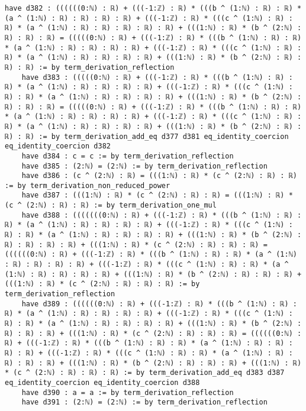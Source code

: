 \documentclass{article}
\begin{document}
\begin{tcolorbox}[colback=white!10, width=\linewidth]
\begin{lstlisting}[language=Lean4]
    have d382 : ((((((0:ℕ) : ℝ) + (((-1:ℤ) : ℝ) * (((b ^ (1:ℕ) : ℝ) : ℝ) * (a ^ (1:ℕ) : ℝ) : ℝ) : ℝ) : ℝ) + (((-1:ℤ) : ℝ) * (((c ^ (1:ℕ) : ℝ) : ℝ) * (a ^ (1:ℕ) : ℝ) : ℝ) : ℝ) : ℝ) : ℝ) + (((1:ℕ) : ℝ) * (b ^ (2:ℕ) : ℝ) : ℝ) : ℝ) = (((((0:ℕ) : ℝ) + (((-1:ℤ) : ℝ) * (((b ^ (1:ℕ) : ℝ) : ℝ) * (a ^ (1:ℕ) : ℝ) : ℝ) : ℝ) : ℝ) + (((-1:ℤ) : ℝ) * (((c ^ (1:ℕ) : ℝ) : ℝ) * (a ^ (1:ℕ) : ℝ) : ℝ) : ℝ) : ℝ) + (((1:ℕ) : ℝ) * (b ^ (2:ℕ) : ℝ) : ℝ) : ℝ) := by term_derivation_reflection
    have d383 : (((((0:ℕ) : ℝ) + (((-1:ℤ) : ℝ) * (((b ^ (1:ℕ) : ℝ) : ℝ) * (a ^ (1:ℕ) : ℝ) : ℝ) : ℝ) : ℝ) + (((-1:ℤ) : ℝ) * (((c ^ (1:ℕ) : ℝ) : ℝ) * (a ^ (1:ℕ) : ℝ) : ℝ) : ℝ) : ℝ) + (((1:ℕ) : ℝ) * (b ^ (2:ℕ) : ℝ) : ℝ) : ℝ) = (((((0:ℕ) : ℝ) + (((-1:ℤ) : ℝ) * (((b ^ (1:ℕ) : ℝ) : ℝ) * (a ^ (1:ℕ) : ℝ) : ℝ) : ℝ) : ℝ) + (((-1:ℤ) : ℝ) * (((c ^ (1:ℕ) : ℝ) : ℝ) * (a ^ (1:ℕ) : ℝ) : ℝ) : ℝ) : ℝ) + (((1:ℕ) : ℝ) * (b ^ (2:ℕ) : ℝ) : ℝ) : ℝ) := by term_derivation_add_eq d377 d381 eq_identity_coercion eq_identity_coercion d382
    have d384 : c = c := by term_derivation_reflection
    have d385 : (2:ℕ) = (2:ℕ) := by term_derivation_reflection
    have d386 : (c ^ (2:ℕ) : ℝ) = (((1:ℕ) : ℝ) * (c ^ (2:ℕ) : ℝ) : ℝ) := by term_derivation_non_reduced_power
    have d387 : (((1:ℕ) : ℝ) * (c ^ (2:ℕ) : ℝ) : ℝ) = (((1:ℕ) : ℝ) * (c ^ (2:ℕ) : ℝ) : ℝ) := by term_derivation_one_mul
    have d388 : (((((((0:ℕ) : ℝ) + (((-1:ℤ) : ℝ) * (((b ^ (1:ℕ) : ℝ) : ℝ) * (a ^ (1:ℕ) : ℝ) : ℝ) : ℝ) : ℝ) + (((-1:ℤ) : ℝ) * (((c ^ (1:ℕ) : ℝ) : ℝ) * (a ^ (1:ℕ) : ℝ) : ℝ) : ℝ) : ℝ) + (((1:ℕ) : ℝ) * (b ^ (2:ℕ) : ℝ) : ℝ) : ℝ) : ℝ) + (((1:ℕ) : ℝ) * (c ^ (2:ℕ) : ℝ) : ℝ) : ℝ) = ((((((0:ℕ) : ℝ) + (((-1:ℤ) : ℝ) * (((b ^ (1:ℕ) : ℝ) : ℝ) * (a ^ (1:ℕ) : ℝ) : ℝ) : ℝ) : ℝ) + (((-1:ℤ) : ℝ) * (((c ^ (1:ℕ) : ℝ) : ℝ) * (a ^ (1:ℕ) : ℝ) : ℝ) : ℝ) : ℝ) + (((1:ℕ) : ℝ) * (b ^ (2:ℕ) : ℝ) : ℝ) : ℝ) + (((1:ℕ) : ℝ) * (c ^ (2:ℕ) : ℝ) : ℝ) : ℝ) := by term_derivation_reflection
    have d389 : ((((((0:ℕ) : ℝ) + (((-1:ℤ) : ℝ) * (((b ^ (1:ℕ) : ℝ) : ℝ) * (a ^ (1:ℕ) : ℝ) : ℝ) : ℝ) : ℝ) + (((-1:ℤ) : ℝ) * (((c ^ (1:ℕ) : ℝ) : ℝ) * (a ^ (1:ℕ) : ℝ) : ℝ) : ℝ) : ℝ) + (((1:ℕ) : ℝ) * (b ^ (2:ℕ) : ℝ) : ℝ) : ℝ) + (((1:ℕ) : ℝ) * (c ^ (2:ℕ) : ℝ) : ℝ) : ℝ) = ((((((0:ℕ) : ℝ) + (((-1:ℤ) : ℝ) * (((b ^ (1:ℕ) : ℝ) : ℝ) * (a ^ (1:ℕ) : ℝ) : ℝ) : ℝ) : ℝ) + (((-1:ℤ) : ℝ) * (((c ^ (1:ℕ) : ℝ) : ℝ) * (a ^ (1:ℕ) : ℝ) : ℝ) : ℝ) : ℝ) + (((1:ℕ) : ℝ) * (b ^ (2:ℕ) : ℝ) : ℝ) : ℝ) + (((1:ℕ) : ℝ) * (c ^ (2:ℕ) : ℝ) : ℝ) : ℝ) := by term_derivation_add_eq d383 d387 eq_identity_coercion eq_identity_coercion d388
    have d390 : a = a := by term_derivation_reflection
    have d391 : (2:ℕ) = (2:ℕ) := by term_derivation_reflection

\end{lstlisting}
\end{tcolorbox}
\end{document}
